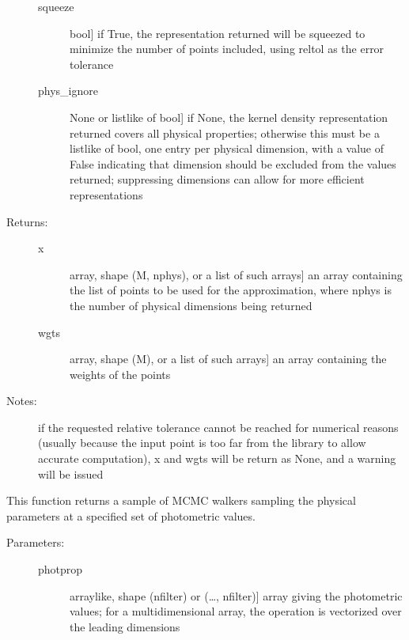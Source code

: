 \documentclass[letterpaper,10pt,english]{sphinxmanual}
\begin{document}
\begin{fulllineitems}
\begin{fulllineitems}
\begin{description}
\begin{description}
\item[{squeeze}] \leavevmode{[}bool{]}
if True, the representation returned will be squeezed to
minimize the number of points included, using reltol as
the error tolerance

\item[{phys\_ignore}] \leavevmode{[}None or listlike of bool{]}
if None, the kernel density representation returned
covers all physical properties; otherwise this must be a
listlike of bool, one entry per physical dimension, with
a value of False indicating that dimension should be
excluded from the values returned; suppressing
dimensions can allow for more efficient representations

\end{description}

\item[{Returns:}] \leavevmode\begin{description}
\item[{x}] \leavevmode{[}array, shape (M, nphys), or a list of such arrays{]}
an array containing the list of points to be used for
the approximation, where nphys is the number of
physical dimensions being returned

\item[{wgts}] \leavevmode{[}array, shape (M), or a list of such arrays{]}
an array containing the weights of the points

\end{description}

\item[{Notes:}] \leavevmode
if the requested relative tolerance cannot be reached for
numerical reasons (usually because the input point is too
far from the library to allow accurate computation), x and
wgts will be return as None, and a warning will be issued

\end{description}

\end{fulllineitems}


\begin{fulllineitems}
\label{\detokenize{bayesphot:slugpy.bayesphot.bp.bp.mcmc}}
This function returns a sample of MCMC walkers sampling the
physical parameters at a specified set of photometric values.
\begin{description}
\item[{Parameters:}] \leavevmode\begin{description}
\item[{photprop}] \leavevmode{[}arraylike, shape (nfilter) or (…, nfilter){]}
array giving the photometric values; for a
multidimensional array, the operation is vectorized over
the leading dimensions


\end{description}
\end{description}
\end{fulllineitems}
\end{fulllineitems}
\end{document}

